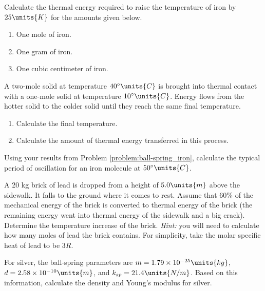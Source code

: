\begin{problem} 
  Calculate the thermal energy required to raise the temperature of
  iron by $25\units{K}$ for the amounts given below.
\begin{enumerate}
\item One mole of iron.
\item One gram of iron.
\item One cubic centimeter of iron.
\end{enumerate}
\label{problem:mole_kg_cc}
\end{problem}


\begin{problem}
  A two-mole solid at temperature $40^\circ\units{C}$ is
  brought into thermal contact with a one-mole solid at
  temperature $10^\circ\units{C}$.  Energy flows from the hotter solid
  to the colder solid until they reach the same final temperature.
\begin{enumerate}
\item Calculate the final temperature.
\item Calculate the amount of thermal energy transferred in this process.
\end{enumerate}
\label{problem:calorimetry}
\end{problem}

\begin{problem}
  Using your results from Problem \ref{problem:ball-spring_iron},
  calculate the typical period of oscillation for an iron molecule
  at $50^\circ\units{C}$.
\label{problem:iron_oscillation}
\end{problem}

\begin{problem}
  A 20 kg brick of lead is dropped from a height of $5.0\units{m}$
  above the sidewalk.  It falls to the ground where it comes to rest.
  Assume that 60\% of the mechanical energy of the brick is converted
  to thermal energy of the brick (the remaining energy went into
  thermal energy of the sidewalk and a big crack).  Determine the
  temperature increase of the brick. {\it Hint:} you will need to
  calculate how many moles of lead the brick contains.  For
  simplicity, take the molar specific heat of lead to be $3R$.
\label{problem:falling_brick}
\end{problem}


\begin{problem}
  For silver, the ball-spring parameters are $m=1.79\times
  10^{-25}\units{kg}$, $d=2.58\times 10^{-10}\units{m}$, and
  $k_{sp}=21.4\units{N/m}$.  Based on this information, calculate the
  density and Young's modulus for silver.
\label{problem:silver_ball-spring}
\end{problem}


